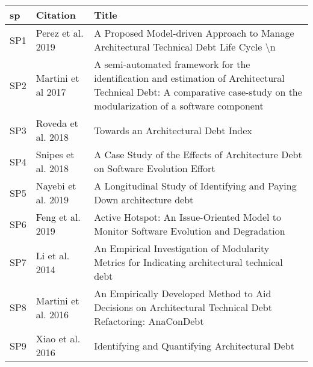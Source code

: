 \begin{tabular}{lll}
\toprule
   sp &                        Citation &                                                                                                                                                                      Title \\
\midrule
  SP1 &               Perez et al. 2019 &                                                                                      A Proposed Model-driven Approach to Manage Architectural Technical Debt Life Cycle \textbackslash n \\
  SP2 &              Martini et al 2017 &  A semi-automated framework for the identification and estimation of Architectural Technical Debt: A comparative case-study on the modularization of a software component  \\
  SP3 &              Roveda et al. 2018 &                                                                                                                                        Towards an Architectural Debt Index \\
  SP4 &              Snipes et al. 2018 &                                                                                             A Case Study of the Effects of Architecture Debt on Software Evolution Effort  \\
  SP5 &              Nayebi et al. 2019 &                                                                                                     A Longitudinal Study of Identifying and Paying Down architecture debt  \\
  SP6 &                Feng et al. 2019 &                                                                                     Active Hotspot: An Issue-Oriented Model to Monitor Software Evolution and Degradation  \\
  SP7 &                  Li et al. 2014 &                                                                              An  Empirical Investigation of Modularity Metrics for Indicating architectural technical debt \\
  SP8 &             Martini et al. 2016 &                                                                  An Empirically Developed Method to Aid Decisions on Architectural Technical Debt Refactoring: AnaConDebt  \\
  SP9 &                Xiao et al. 2016 &                                                                                                                            Identifying and Quantifying Architectural Debt  \\

\end{tabular}
